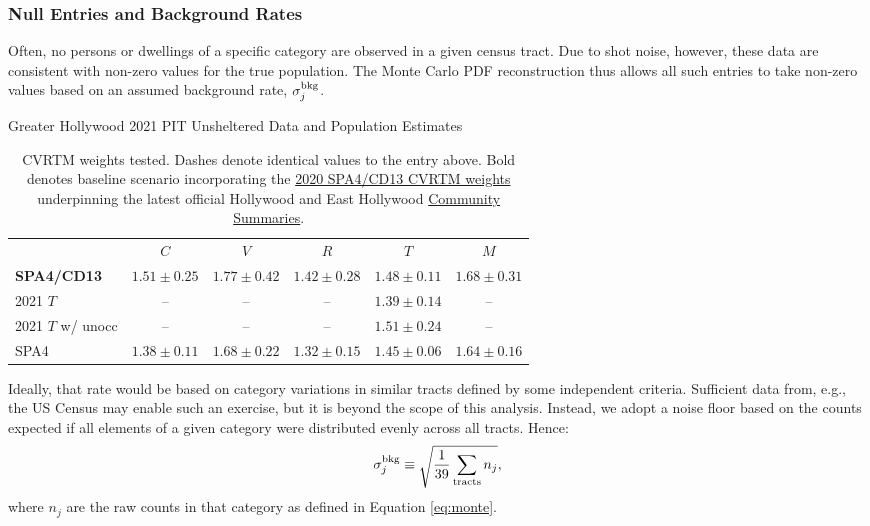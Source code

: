 \documentclass[11pt,twocolumn]{article}
\begin{document}
\subsubsection{Null Entries and Background Rates}
\label{sec:nulls}

Often, no persons or dwellings of a specific category are observed in a given census tract. Due to shot 
noise, however, these data are consistent with non-zero values for the true population. The Monte Carlo 
PDF reconstruction thus allows all such entries to take non-zero values based on an assumed background rate,
$\sigma_{j}^{\rm bkg}$. 

\begin{table}[t]
\centering
\caption{Greater Hollywood 2021 PIT Unsheltered Data and Population Estimates}
\begin{tabular}{lccccc}
\toprule
 & $C$ & $V$ & $R$ & $T$ & $M$ \\ \cmidrule{1-6}
{\bf SPA4/CD13} & $1.51\pm0.25$ & $1.77\pm0.42$ & $1.42\pm0.28$ & $1.48\pm0.11$ & $1.68\pm0.31$ \\
2021 $T$ & -- & -- & -- & $1.39\pm0.14$ & --\\
2021 $T$ w/ unocc & -- & -- & --& $1.51\pm0.24$ & --\\
SPA4 & $1.38\pm0.11$ & $1.68\pm0.22$ & $1.32\pm0.15$ & $1.45\pm0.06$ & $1.64\pm0.16$\\
\bottomrule
\end{tabular}
\caption*{CVRTM weights tested. Dashes denote identical values to the entry above. Bold denotes 
baseline scenario incorporating the 
\href{https://www.lahsa.org/documents?id=4635-usc-2018-2020-multipliers-and-estimates-overview}
{2020 SPA4/CD13 CVRTM weights} underpinning the latest official Hollywood and East Hollywood 
\href{https://www.lahsa.org/documents?id=4686-2020-greater-los-angeles-city-community-homelessness-report-service-planning-area-4.pdf}{Community Summaries}.}
\label{tbl:weights}
\end{table}

Ideally, that rate would be based on category variations in similar tracts defined by some independent 
criteria. Sufficient data from, e.g., the US Census may enable such an exercise, but it is beyond the scope of 
this analysis. Instead, we adopt a noise floor based on the counts expected if all elements of a given category
were distributed evenly across all tracts. Hence:
\begin{equation}
	\sigma_{j}^{\rm bkg} \equiv \sqrt{\frac{1}{39}\sum_{\rm tracts}n_{j}},
\end{equation}
where $n_{j}$ are the raw counts in that category as defined in Equation \ref{eq:monte}.
\end{document}
